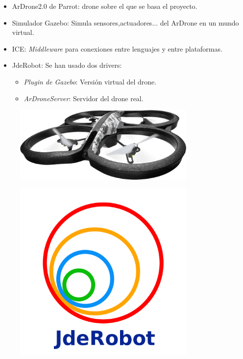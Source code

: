 \documentclass[notes,slidesec,a4]{seminar}
\begin{document}
\begin{hslide}
\begin{minipage}[t]{0.7\textwidth}
\begin{itemize}
\item ArDrone2.0 de Parrot: drone sobre el que se basa el proyecto.
\item Simulador Gazebo: Simula sensores,actuadores... del ArDrone en un mundo virtual.
\item ICE: \emph{Middleware} para conexiones entre lenguajes y entre plataformas.
\item JdeRobot: Se han usado dos drivers:
\begin{itemize}
\item \emph{Plugin de Gazebo}: Versión virtual del drone.
\item \emph{ArDroneServer}: Servidor del drone real.
\end{itemize}
\end{itemize}
\end{minipage}
\begin{minipage}[t]{0.3\textwidth}
\begin{center}
\begin{figure}
\includegraphics[width=0.8\textwidth]{img/ardrone}
\end{figure}
\end{center}
\begin{center}
\begin{figure}
\includegraphics[width=0.8\textwidth]{img/jderobot}
\end{figure}
\end{center}
\end{minipage}
\end{hslide}
\end{document}
